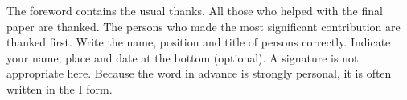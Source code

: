 

The foreword contains the usual thanks. All those who helped with the final paper are thanked.
The persons who made the most significant contribution are thanked first. Write the name, position and title of persons correctly.
Indicate your name, place and date at the bottom (optional). A signature is not appropriate here.
Because the word in advance is strongly personal, it is often written in the I form.
